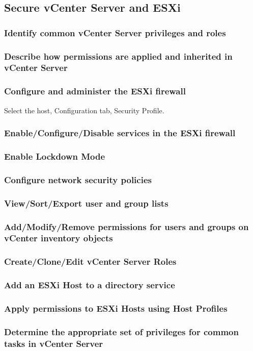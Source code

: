 \subsection{Secure vCenter Server and ESXi}

\subsubsection{Identify common vCenter Server privileges and roles}

\subsubsection{Describe how permissions are applied and inherited in vCenter Server}

\subsubsection{Configure and administer the ESXi firewall}

Select the host, Configuration tab, Security Profile.

\subsubsection{Enable/Configure/Disable services in the ESXi firewall}

\subsubsection{Enable Lockdown Mode}

\subsubsection{Configure network security policies}

\subsubsection{View/Sort/Export user and group lists}

\subsubsection{Add/Modify/Remove permissions for users and groups on vCenter inventory objects}

\subsubsection{Create/Clone/Edit vCenter Server Roles}

\subsubsection{Add an ESXi Host to a directory service}

\subsubsection{Apply permissions to ESXi Hosts using Host Profiles}

\subsubsection{Determine the appropriate set of privileges for common tasks in vCenter Server}
